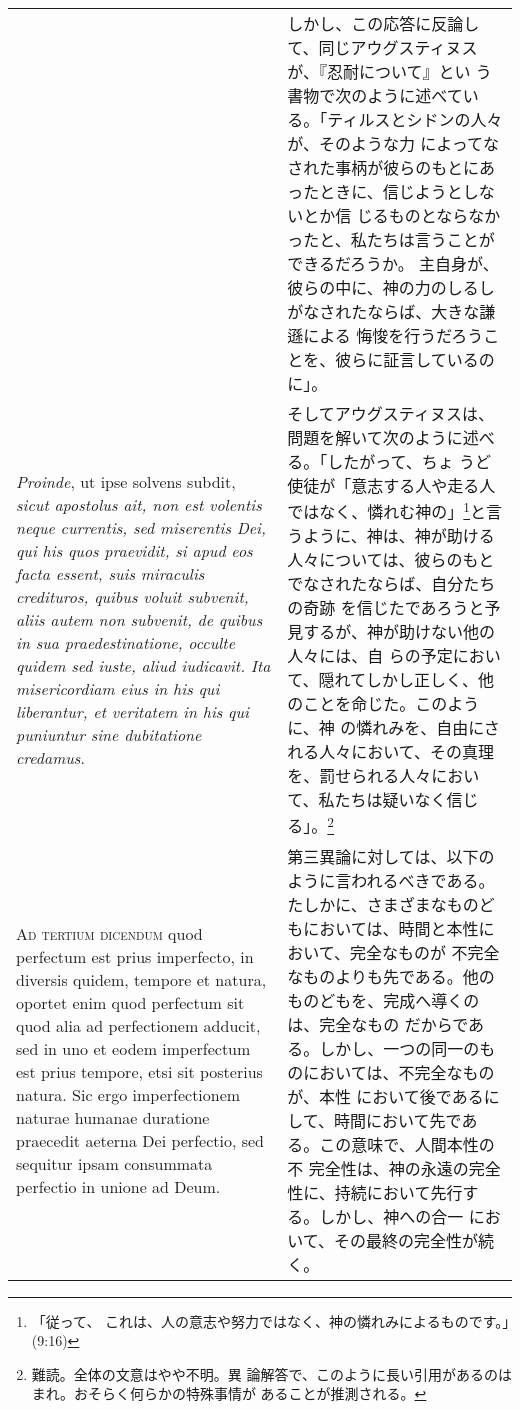 \documentclass[10pt]{jsarticle} %
\begin{document}
\begin{longtable}{p{21em}p{21em}}
&

しかし、この応答に反論して、同じアウグスティヌスが、『忍耐について』とい
 う書物で次のように述べている。「ティルスとシドンの人々が、そのような力
 によってなされた事柄が彼らのもとにあったときに、信じようとしないとか信
 じるものとならなかったと、私たちは言うことができるだろうか。
 主自身が、彼らの中に、神の力のしるしがなされたならば、大きな謙遜による
 悔悛を行うだろうことを、彼らに証言しているのに」。


\\

{\itshape Proinde}, ut ipse solvens subdit, {\itshape sicut
apostolus ait, non est volentis neque currentis, sed miserentis Dei, qui
his quos praevidit, si apud eos facta essent, suis miraculis credituros,
quibus voluit subvenit, aliis autem non subvenit, de quibus in sua
praedestinatione, occulte quidem sed iuste, aliud iudicavit. Ita
misericordiam eius in his qui liberantur, et veritatem in his qui
puniuntur sine dubitatione credamus}.


&

そしてアウグスティヌスは、問題を解いて次のように述べる。「したがって、ちょ
 うど使徒が「意志する人や走る人ではなく、憐れむ神の」\footnote{「従って、
 これは、人の意志や努力ではなく、神の憐れみによるものです。」(9:16)}と言
 うように、神は、神が助ける人々については、彼らのもとでなされたならば、自分たちの奇跡
 を信じたであろうと予見するが、神が助けない他の人々には、自
 らの予定において、隠れてしかし正しく、他のことを命じた。このように、神
 の憐れみを、自由にされる人々において、その真理を、罰せられる人々におい
 て、私たちは疑いなく信じる」。\footnote{難読。全体の文意はやや不明。異
 論解答で、このように長い引用があるのはまれ。おそらく何らかの特殊事情が
 あることが推測される。}


\\


{\scshape Ad tertium dicendum} quod perfectum est prius
imperfecto, in diversis quidem, tempore et natura, oportet enim quod
perfectum sit quod alia ad perfectionem adducit, sed in uno et eodem
imperfectum est prius tempore, etsi sit posterius natura. Sic ergo
imperfectionem naturae humanae duratione praecedit aeterna Dei
perfectio, sed sequitur ipsam consummata perfectio in unione ad Deum.


&

第三異論に対しては、以下のように言われるべきである。
たしかに、さまざまなものどもにおいては、時間と本性において、完全なものが
 不完全なものよりも先である。他のものどもを、完成へ導くのは、完全なもの
 だからである。しかし、一つの同一のものにおいては、不完全なものが、本性
 において後であるにして、時間において先である。この意味で、人間本性の不
 完全性は、神の永遠の完全性に、持続において先行する。しかし、神への合一
 において、その最終の完全性が続く。


\end{longtable}
\newpage
\end{document}
